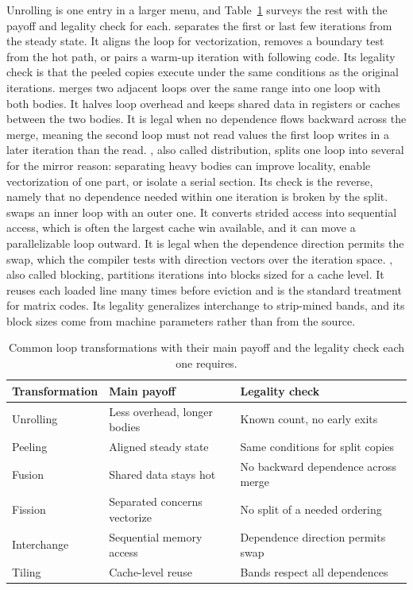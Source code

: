 Unrolling is one entry in a larger menu, and Table~\ref{tab:ch19-menu} surveys the rest with the payoff and legality check for each.
 separates the first or last few iterations from the steady state.
It aligns the loop for vectorization, removes a boundary test from the hot path, or pairs a warm-up iteration with following code.
Its legality check is that the peeled copies execute under the same conditions as the original iterations.
 merges two adjacent loops over the same range into one loop with both bodies.
It halves loop overhead and keeps shared data in registers or caches between the two bodies.
It is legal when no dependence flows backward across the merge, meaning the second loop must not read values the first loop writes in a later iteration than the read.
, also called distribution, splits one loop into several for the mirror reason: separating heavy bodies can improve locality, enable vectorization of one part, or isolate a serial section.
Its check is the reverse, namely that no dependence needed within one iteration is broken by the split.
 swaps an inner loop with an outer one.
It converts strided access into sequential access, which is often the largest cache win available, and it can move a parallelizable loop outward.
It is legal when the dependence direction permits the swap, which the compiler tests with direction vectors over the iteration space.
, also called blocking, partitions iterations into blocks sized for a cache level.
It reuses each loaded line many times before eviction and is the standard treatment for matrix codes.
Its legality generalizes interchange to strip-mined bands, and its block sizes come from machine parameters rather than from the source.

\begin{table}
  \centering
  \caption{Common loop transformations with their main payoff and the legality check each one requires.}
  \label{tab:ch19-menu}
  \begin{tabular}{lll}
    \toprule
    Transformation & Main payoff & Legality check \\
    \midrule
    Unrolling & Less overhead, longer bodies & Known count, no early exits \\
    Peeling & Aligned steady state & Same conditions for split copies \\
    Fusion & Shared data stays hot & No backward dependence across merge \\
    Fission & Separated concerns vectorize & No split of a needed ordering \\
    Interchange & Sequential memory access & Dependence direction permits swap \\
    Tiling & Cache-level reuse & Bands respect all dependences \\
    \bottomrule
  \end{tabular}
\end{table}


